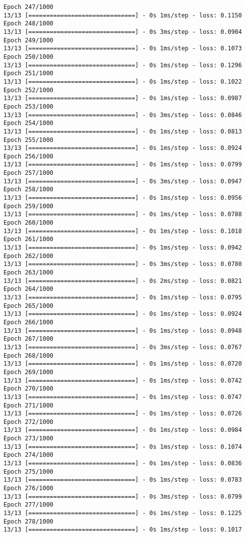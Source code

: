 \documentclass[11pt]{article}
\begin{document}
\begin{Verbatim}[commandchars=\\\{\}]
Epoch 247/1000
13/13 [==============================] - 0s 1ms/step - loss: 0.1150
Epoch 248/1000
13/13 [==============================] - 0s 3ms/step - loss: 0.0904
Epoch 249/1000
13/13 [==============================] - 0s 1ms/step - loss: 0.1073
Epoch 250/1000
13/13 [==============================] - 0s 1ms/step - loss: 0.1296
Epoch 251/1000
13/13 [==============================] - 0s 1ms/step - loss: 0.1022
Epoch 252/1000
13/13 [==============================] - 0s 1ms/step - loss: 0.0987
Epoch 253/1000
13/13 [==============================] - 0s 3ms/step - loss: 0.0846
Epoch 254/1000
13/13 [==============================] - 0s 1ms/step - loss: 0.0813
Epoch 255/1000
13/13 [==============================] - 0s 1ms/step - loss: 0.0924
Epoch 256/1000
13/13 [==============================] - 0s 1ms/step - loss: 0.0799
Epoch 257/1000
13/13 [==============================] - 0s 3ms/step - loss: 0.0947
Epoch 258/1000
13/13 [==============================] - 0s 1ms/step - loss: 0.0956
Epoch 259/1000
13/13 [==============================] - 0s 1ms/step - loss: 0.0788
Epoch 260/1000
13/13 [==============================] - 0s 1ms/step - loss: 0.1018
Epoch 261/1000
13/13 [==============================] - 0s 1ms/step - loss: 0.0942
Epoch 262/1000
13/13 [==============================] - 0s 3ms/step - loss: 0.0780
Epoch 263/1000
13/13 [==============================] - 0s 2ms/step - loss: 0.0821
Epoch 264/1000
13/13 [==============================] - 0s 1ms/step - loss: 0.0795
Epoch 265/1000
13/13 [==============================] - 0s 1ms/step - loss: 0.0924
Epoch 266/1000
13/13 [==============================] - 0s 1ms/step - loss: 0.0948
Epoch 267/1000
13/13 [==============================] - 0s 3ms/step - loss: 0.0767
Epoch 268/1000
13/13 [==============================] - 0s 1ms/step - loss: 0.0720
Epoch 269/1000
13/13 [==============================] - 0s 1ms/step - loss: 0.0742
Epoch 270/1000
13/13 [==============================] - 0s 1ms/step - loss: 0.0747
Epoch 271/1000
13/13 [==============================] - 0s 1ms/step - loss: 0.0726
Epoch 272/1000
13/13 [==============================] - 0s 1ms/step - loss: 0.0984
Epoch 273/1000
13/13 [==============================] - 0s 1ms/step - loss: 0.1074
Epoch 274/1000
13/13 [==============================] - 0s 1ms/step - loss: 0.0836
Epoch 275/1000
13/13 [==============================] - 0s 1ms/step - loss: 0.0783
Epoch 276/1000
13/13 [==============================] - 0s 3ms/step - loss: 0.0799
Epoch 277/1000
13/13 [==============================] - 0s 1ms/step - loss: 0.1225
Epoch 278/1000
13/13 [==============================] - 0s 1ms/step - loss: 0.1017

\end{Verbatim}
\end{document}
